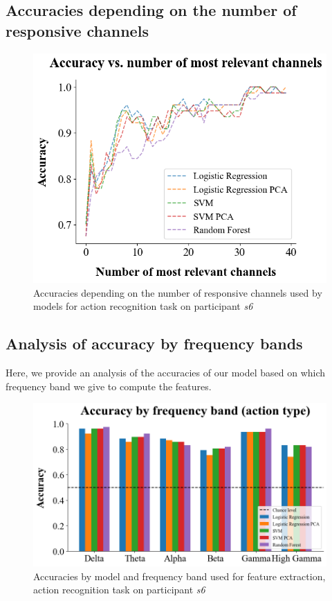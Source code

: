 \documentclass[10pt,conference,compsocconf]{IEEEtran}
\begin{document}
\subsection{Accuracies depending on the number of responsive channels}

\begin{figure}[h!]
    \center
    \includegraphics[width=\linewidth]{../Code/figures/s6_acc_vs_channels.png}
    \caption{Accuracies depending on the number of responsive channels used by models for action recognition task on participant \textit{s6}}
    \label{appfig:accuracies_ExObs_channels}
\end{figure}
\FloatBarrier

\subsection{Analysis of accuracy by frequency bands}
Here, we provide an analysis of the accuracies of our model based on which frequency band we give to compute the features.

\begin{figure}[h!]
    \center
    \includegraphics[width=\linewidth]{../Code/figures/s6_accuracies_ExObs_freq_bands.png}
    \caption{Accuracies by model and frequency band used for feature extraction, action recognition task on participant \textit{s6}}
    \label{appfig:accuracies_ExObs_freq_bands}
\end{figure}
\FloatBarrier
\end{document}
